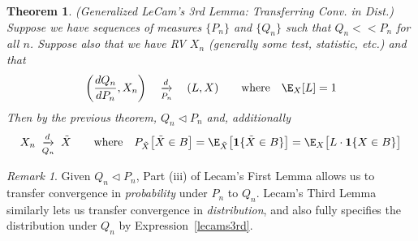 \documentclass[12pt]{article}
\theoremstyle{plain}
\newtheorem{thm}{Theorem}[section]
\newtheorem{cor}[thm]{Corollary}
\theoremstyle{definition}
\theoremstyle{remark}
\newtheorem*{rmk}{Remark}
\newcommand{\dto}{\xrightarrow{d}}
\begin{document}
\begin{thm}
\label{thm:lecams3rd}
\emph{(Generalized LeCam's 3rd Lemma: Transferring Conv. in Dist.)}
Suppose we have sequences of measures $\{P_n\}$ and $\{Q_n\}$ such that
$Q_n<<P_n$ for all $n$. Suppose also that we have RV $X_n$
(generally some test, statistic, etc.) and that
\begin{align*}
  \left(\frac{dQ_n}{dP_n},X_n\right)
  \quad\underset{P_n}{\dto}\quad
  (L,X)
  \qquad \text{where}\quad
  \E_X[L]=1
\end{align*}
Then by the previous theorem, $Q_n\vartriangleleft P_n$ and,
additionally
\begin{align}
  X_n\;\underset{Q_n}{\dto}\;\tilde{X}
  \qquad \text{where}\quad
  P_{\tilde{X}}\big[\tilde{X}\in B\big]
  = \E_{\tilde{X}}\big[\mathbf{1}\{\tilde{X}\in B\}\big]
  =\E_X\big[L\cdot \mathbf{1}\{X\in B\}\big]
  \label{lecams3rd}
\end{align}
\end{thm}
\begin{rmk}
Given $Q_n\vartriangleleft P_n$, Part (iii) of Lecam's First Lemma
allows us to transfer convergence in \emph{probability} under $P_n$ to
$Q_n$.
Lecam's Third Lemma similarly lets us transfer convergence in
\emph{distribution}, and also fully specifies the distribution under
$Q_n$ by Expression~\ref{lecams3rd}.
\end{rmk}

\end{document}
